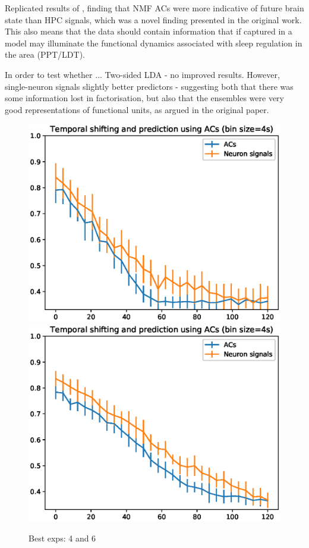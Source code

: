 \documentclass[mphil,deptreport,ianc]{infthesis} %
\begin{document}


Replicated results of \cite{Tsunematsu2019}, finding that NMF ACs were more indicative of future brain state than HPC signals, which was a novel finding presented in the original work.
This also means that the data should contain information that if captured in a model may illuminate the functional dynamics associated with sleep regulation in the area (PPT/LDT).

In order to test whether ...
Two-sided LDA - no improved results.
However, single-neuron signals slightly better predictors - suggesting both that there was some information lost in factorisation, but also that the ensembles were very good representations of functional units, as argued in the original paper.


\begin{figure}
    \centering
    \includegraphics[width=0.49\columnwidth]{figures/LDA/lda_temporal_shifting_and_prediction_bins_4_lda_acs_temporal_windows_4_exp_6.eps}
    \includegraphics[width=0.49\columnwidth]{figures/LDA/lda_temporal_shifting_and_prediction_bins_4_lda_acs_temporal_windows_4_exp_4.eps}
    \caption{Best exps: 4 and 6}
\end{figure}
\end{document}
